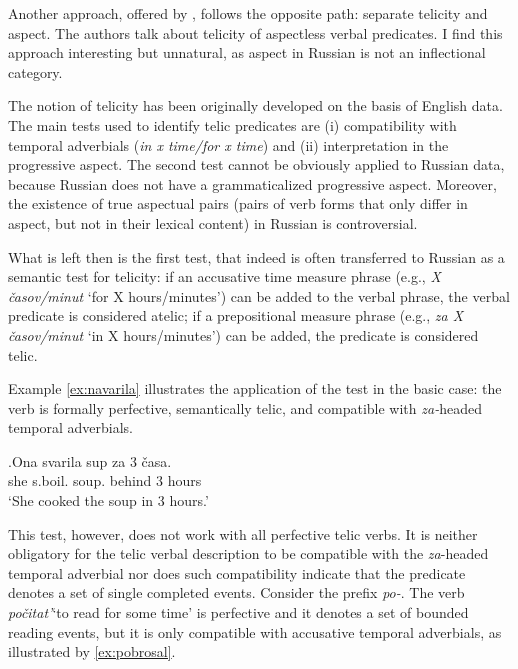 Another approach, offered by \citet{PaduchevaPentus:08}, follows the opposite path: separate telicity and aspect. The authors talk about telicity of aspectless verbal predicates. I find this approach interesting but unnatural, as aspect in Russian is not an inflectional category. 

The notion of telicity has been originally developed on the basis of English data. The main tests used to identify telic predicates are (i) compatibility with temporal adverbials (\textit{in x time/for x time}) and (ii) interpretation in the progressive aspect. The second test cannot be obviously applied to Russian data, because Russian does not have a grammaticalized progressive aspect. Moreover, the existence of true aspectual pairs (pairs of verb forms that only differ in aspect, but not in their lexical content) in Russian is controversial.

What is left then is the first test, that indeed is often transferred to Russian as a semantic test for telicity: if an accusative time measure phrase (e.g., \textit{X \v{c}asov/minut} `for X hours/minutes') can be added to the verbal phrase, the verbal predicate is considered atelic; if a prepositional measure phrase (e.g., \textit{za X \v{c}asov/minut} `in X hours/minutes') can be added, the predicate is considered telic.

Example \ref{ex:navarila} illustrates the application of the test in the basic case: the verb is formally perfective, semantically telic, and compatible with \textit{za-}headed temporal adverbials. 

\exg.\label{ex:navarila}Ona svarila\textsuperscript{\PF} sup za 3 \v{c}asa.\\
she s.boil. soup. behind 3 hours\\
\trans `She cooked the soup in 3 hours.'

This test, however, does not work with all perfective telic verbs. It is neither obligatory for the telic verbal description to be compatible with the \textit{za}-headed temporal adverbial nor does such compatibility indicate that the predicate denotes a set of single completed events. Consider the prefix \textit{po-}. The verb \textit{po\v{c}itat'\textsuperscript{\PF}}`to read for some time' is perfective and it denotes a set of bounded reading events, but it is only compatible with accusative temporal adverbials, as illustrated by \ref{ex:pobrosal}.

